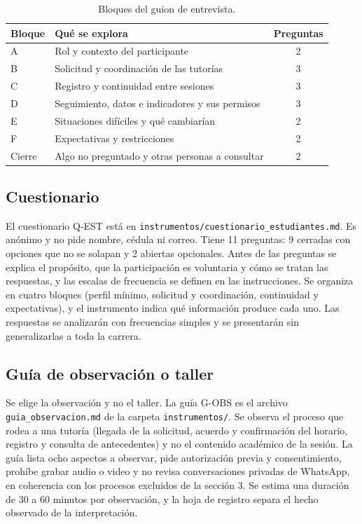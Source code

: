 \documentclass[11pt,a4paper]{article}
\begin{document}
\begin{table}[ht]
\centering
\small
\caption{Bloques del guion de entrevista.}
\label{tab:bloques}
\begin{tabularx}{\textwidth}{
    |l
    |>{\raggedright\arraybackslash}X
    |c|
}
\hline
\textbf{Bloque} & \textbf{Qué se explora} & \textbf{Preguntas} \\ \hline
A & Rol y contexto del participante & 2 \\ \hline
B & Solicitud y coordinación de las tutorías & 3 \\ \hline
C & Registro y continuidad entre sesiones & 3 \\ \hline
D & Seguimiento, datos e indicadores y sus permisos & 3 \\ \hline
E & Situaciones difíciles y qué cambiarían & 2 \\ \hline
F & Expectativas y restricciones & 2 \\ \hline
Cierre & Algo no preguntado y otras personas a consultar & 2 \\ \hline
\end{tabularx}
\end{table}

\subsection{Cuestionario}

El cuestionario Q-EST está en \texttt{instrumentos/\allowbreak cuestionario\_estudiantes.md}. Es anónimo y no pide nombre, cédula ni correo. Tiene 11 preguntas: 9 cerradas con opciones que no se solapan y 2 abiertas opcionales. Antes de las preguntas se explica el propósito, que la participación es voluntaria y cómo se tratan las respuestas, y las escalas de frecuencia se definen en las instrucciones. Se organiza en cuatro bloques (perfil mínimo, solicitud y coordinación, continuidad y expectativas), y el instrumento indica qué información produce cada uno. Las respuestas se analizarán con frecuencias simples y se presentarán sin generalizarlas a toda la carrera.

\subsection{Guía de observación o taller}

Se elige la observación y no el taller. La guía G-OBS es el archivo \texttt{guia\_observacion.md} de la carpeta \texttt{instrumentos/}. Se observa el proceso que rodea a una tutoría (llegada de la solicitud, acuerdo y confirmación del horario, registro y consulta de antecedentes) y no el contenido académico de la sesión. La guía lista ocho aspectos a observar, pide autorización previa y consentimiento, prohíbe grabar audio o video y no revisa conversaciones privadas de WhatsApp, en coherencia con los procesos excluidos de la sección 3. Se estima una duración de 30 a 60 minutos por observación, y la hoja de registro separa el hecho observado de la interpretación.
\end{document}
